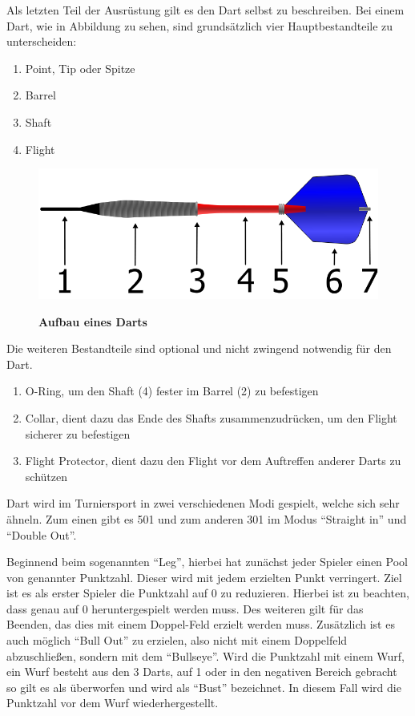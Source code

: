 Als letzten Teil der Ausrüstung gilt es den Dart selbst zu beschreiben. Bei einem Dart, wie in Abbildung  zu sehen, sind grundsätzlich vier Hauptbestandteile zu unterscheiden:
\begin{enumerate}
    \item Point, Tip oder Spitze
    \item Barrel
    \addtocounter{enumi}{1}
    \item Shaft
    \addtocounter{enumi}{1}
    \item Flight
\end{enumerate}
\begin{figure}
\includegraphics[width=\textwidth]{media/Dart}\\
\caption{\textbf{Aufbau eines Darts\cite{dart2006}}
}
\label{Fig:darts}
\end{figure}
Die weiteren Bestandteile sind optional und nicht zwingend notwendig für den Dart. 
\begin{enumerate}
	\addtocounter{enumi}{1}
	\addtocounter{enumi}{1}
    \item O-Ring, um den Shaft (4) fester im Barrel (2) zu befestigen
    \item Collar, dient dazu das Ende des Shafts zusammenzudrücken, um den Flight sicherer zu befestigen
    \addtocounter{enumi}{1}
    \item Flight Protector, dient dazu den Flight vor dem Auftreffen anderer Darts zu schützen

\end{enumerate}

Dart wird im Turniersport in zwei verschiedenen Modi gespielt, welche sich sehr ähneln. Zum einen gibt es 501 und zum anderen 301 im Modus "`Straight in"'  und  "`Double Out"'.

Beginnend beim sogenannten "`Leg"', hierbei hat zunächst jeder Spieler einen Pool von genannter Punktzahl. Dieser wird mit jedem erzielten Punkt verringert. Ziel ist es als erster Spieler die Punktzahl auf 0 zu reduzieren. Hierbei ist zu beachten, dass genau auf 0 heruntergespielt werden muss. Des weiteren gilt für das Beenden, das dies mit einem Doppel-Feld erzielt werden muss. Zusätzlich ist es auch möglich "`Bull Out"' zu erzielen, also nicht mit einem Doppelfeld abzuschließen, sondern mit dem "`Bullseye"'. Wird die Punktzahl mit einem Wurf, ein Wurf besteht aus den 3 Darts, auf 1 oder in den negativen Bereich gebracht so gilt es als überworfen und wird als "`Bust"' bezeichnet. In diesem Fall wird die Punktzahl vor dem Wurf wiederhergestellt. \autocite[5]{DartsRegel2016} 

